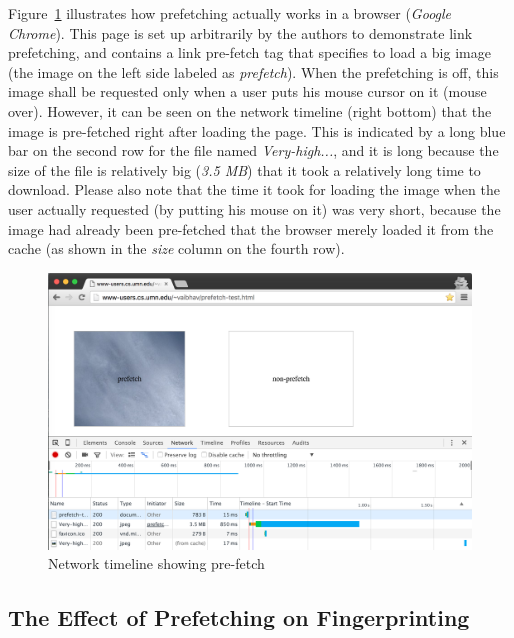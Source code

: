 Figure~\ref{fig:network} illustrates how prefetching actually works in a browser ({\it Google Chrome}).
This page is set up arbitrarily by the authors to demonstrate link prefetching, and contains a link pre-fetch tag that specifies to load a big image (the image on the left side labeled as {\it prefetch}).
When the prefetching is off, this image shall be requested only when a user puts his mouse cursor on it (mouse over).
However, it can be seen on the network timeline (right bottom) that the image is pre-fetched right after loading the page.
This is indicated by a long blue bar on the second row for the file named {\it Very-high...}, and it is long because the size of the file is relatively big ({\it 3.5 MB}) that it took a relatively long time to download.
Please also note that the time it took for loading the image when the user actually requested (by putting his mouse on it) was very short, because the image had already been pre-fetched that the browser merely loaded it from the cache (as shown in the {\it size} column on the fourth row).

\begin{figure}[h]
\includegraphics[width=\textwidth]{figures/prefetch-network.png}
\centering
\caption{Network timeline showing pre-fetch}
\label{fig:network}
\end{figure}

\subsection{The Effect of Prefetching on Fingerprinting}

